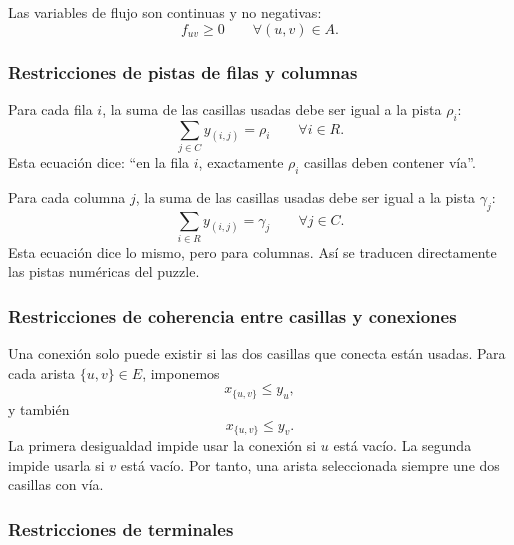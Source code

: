 Las variables de flujo son continuas y no negativas:
\begin{equation}
    f_{uv} \geq 0
    \qquad \forall (u,v) \in A.
    \label{eq:es-domain-f}
\end{equation}

\subsubsection{Restricciones de pistas de filas y columnas}

Para cada fila \(i\), la suma de las casillas usadas debe ser igual a la pista \(\rho_i\):
\begin{equation}
    \sum_{j \in C} y_{(i,j)} = \rho_i
    \qquad \forall i \in R.
    \label{eq:es-row-count}
\end{equation}
Esta ecuación dice: ``en la fila \(i\), exactamente \(\rho_i\) casillas deben contener vía''.

Para cada columna \(j\), la suma de las casillas usadas debe ser igual a la pista \(\gamma_j\):
\begin{equation}
    \sum_{i \in R} y_{(i,j)} = \gamma_j
    \qquad \forall j \in C.
    \label{eq:es-column-count}
\end{equation}
Esta ecuación dice lo mismo, pero para columnas. Así se traducen directamente las pistas numéricas del puzzle.

\subsubsection{Restricciones de coherencia entre casillas y conexiones}

Una conexión solo puede existir si las dos casillas que conecta están usadas. Para cada arista \(\{u,v\} \in E\), imponemos
\begin{equation}
    x_{\{u,v\}} \leq y_u,
    \label{eq:es-edge-cell-u}
\end{equation}
y también
\begin{equation}
    x_{\{u,v\}} \leq y_v.
    \label{eq:es-edge-cell-v}
\end{equation}
La primera desigualdad impide usar la conexión si \(u\) está vacío. La segunda impide usarla si \(v\) está vacío. Por tanto, una arista seleccionada siempre une dos casillas con vía.

\subsubsection{Restricciones de terminales}

